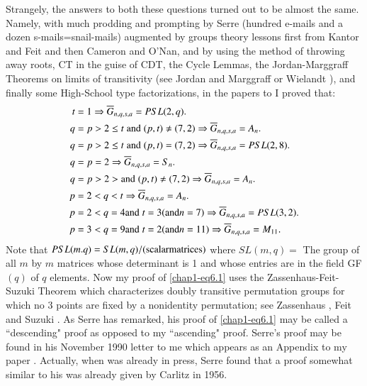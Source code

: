 Strangely, the answers to both these questions turned out to be almost the same. Namely, with much prodding and prompting by Serre (hundred e-mails and a dozen s-mails=snail-mails) augmented by groups theory lessons first from Kantor and Feit and then Cameron and O'Nan, and by using the method of throwing away roots, CT in the guise of CDT, the Cycle Lemmas, the Jordan-Marggraff Theorems on limits of transitivity (see Jordan \cite{chap1-key39} and Marggraff \cite{chap1-key45} or Wielandt \cite{chap1-key60}), and finally some High-School type factorizations, in the papers \cite{chap1-key8} to \cite{chap1-key10} I proved that: 
\begin{align}
t&=1 \Rightarrow \overline{G}_{n,q,s,a} = PSL(2,q).\label{chap1-eq6.1}\\
q&=p > 2 \leq t\; {\rm and} \;(p,t)\neq (7,2) \Rightarrow \overline{G}_{n,q,s,a} = A_{n}.\label{chap1-eq6.2}\\
q&=p > 2 \leq t \;{\rm and} \;(p,t) = (7,2) \Rightarrow \overline{G}_{n,q,s,a} = PSL(2,8).\label{chap1-eq6.3}\\
q&=p = 2 \Rightarrow \overline{G}_{n,q,s,a} = S_{n}.\label{chap1-eq6.4}\\
q&=p > 2 > {\rm and}\; (p,t) \neq (7,2) \Rightarrow \overline{G}_{n,q,s,a} = A_{n}.\label{chap1-eq6.5}\\
p&=2 < q < t \Rightarrow \overline{G}_{n,q,s,a} = A_{n}.\label{chap1-eq6.6}\\
p&=2 < q = 4 {\rm and} \; t=3 ({\rm and} n=7) \Rightarrow \overline{G}_{n,q,s,a} = PSL(3,2).\label{chap1-eq6.7}\\
p&=3 < q = 9 {\rm and} \; t=2 ({\rm and} n=11) \Rightarrow \overline{G}_{n,q,s,a} =M_{11}.\label{chap1-eq6.8}
\end{align}
Note that $PSL(m.q)=SL(m,q)/{\rm(scalar matrices)}$ where $SL(m,q)=$ The group of all $m$ by $m$ matrices whose determinant is 1 and whose entries are in the field GF$(q)$ of $q$ elements. Now my proof of \eqref{chap1-eq6.1} uses the Zassenhaus-Feit-Suzuki Theorem which characterizes doubly transitive permutation groups for which no 3 points are fixed by a nonidentity permutation; see Zassenhaus \cite{chap1-key62}, Feit \cite{chap1-key30} and Suzuki \cite{chap1-key59}. As Serre has remarked, his proof of \eqref{chap1-eq6.1} may be called a ``descending" proof as opposed to my ``ascending" proof. Serre's proof may be found in his November 1990 letter to me which appears as an Appendix to my paper \cite{chap1-key8}. Actually, when \cite{chap1-key8} was already in press, Serre found that a proof somewhat similar to his was already given by Carlitz \cite{chap1-key25} in 1956.  

